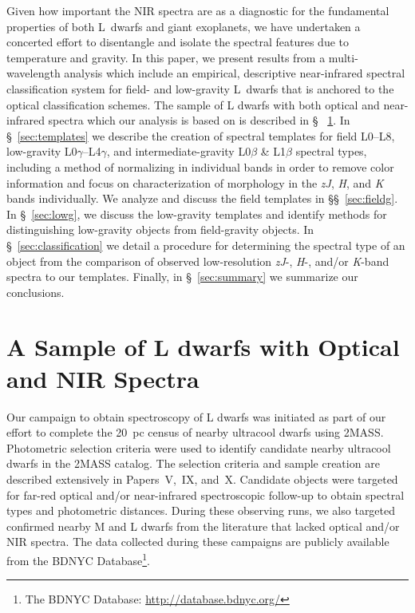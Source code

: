 \documentclass[modern,trackchanges]{aastex61}
\begin{document}
Given how important the NIR spectra are as a diagnostic for the fundamental properties of both L~dwarfs and giant exoplanets, we have undertaken a concerted effort to disentangle and isolate the spectral features due to temperature and gravity.
In this paper, we present results from a multi-wavelength analysis which include an empirical, descriptive near-infrared spectral classification system for field- and low-gravity L~dwarfs that is anchored to the optical classification schemes.
The sample of L dwarfs with both optical and near-infrared spectra which our analysis is based on is described in \S~ \ref{sec:sample}.
In \S~\ref{sec:templates} we describe the creation of spectral templates for field L0--L8, low-gravity L0$\gamma$--L4$\gamma$, and intermediate-gravity L0$\beta$ \& L1$\beta$ spectral types, including a method of normalizing in individual bands in order to remove color information and focus on characterization of morphology in the \emph{zJ}, \emph{H}, and \emph{K} bands individually.
We analyze and discuss the field templates in \S\S~\ref{sec:fieldg}.
In \S~\ref{sec:lowg}, we discuss the low-gravity templates and identify methods for distinguishing low-gravity objects from field-gravity objects.
In \S~\ref{sec:classification} we detail a procedure for determining the spectral type of an object from the comparison of observed low-resolution \emph{zJ}-, \emph{H}-, and/or \emph{K}-band spectra to our templates.
Finally, in \S~\ref{sec:summary} we summarize our conclusions.

\section{A Sample of L dwarfs with Optical and NIR Spectra}
\label{sec:sample}

Our campaign to obtain spectroscopy of L dwarfs was initiated as part of our effort to complete the 20~pc census of nearby ultracool dwarfs using 2MASS.
Photometric selection criteria were used to identify candidate nearby ultracool dwarfs in the 2MASS catalog.
The selection criteria and sample creation are described extensively in Papers~V,~IX, and~X.
Candidate objects were targeted for far-red optical and/or near-infrared spectroscopic follow-up to obtain spectral types and photometric distances.
During these observing runs, we also targeted confirmed nearby M and L dwarfs from the literature that lacked optical and/or NIR spectra.
The data collected during these campaigns are publicly available from the BDNYC Database\footnote{The BDNYC Database: \url{http://database.bdnyc.org/}}.
\end{document}
